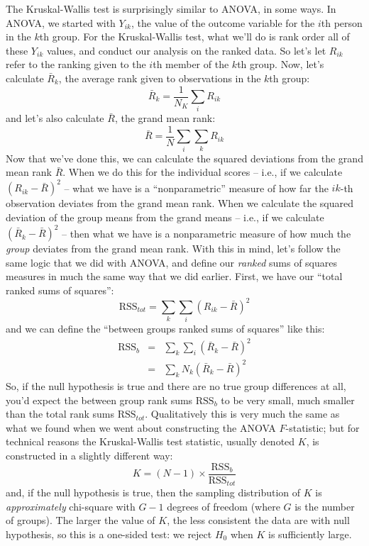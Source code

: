 The Kruskal-Wallis test is surprisingly similar to ANOVA, in some ways. In ANOVA, we started with $Y_{ik}$, the value of the outcome variable for the $i$th person in the $k$th group. For the Kruskal-Wallis test, what we'll do is rank order all of these $Y_{ik}$ values, and conduct our analysis on the ranked data. So let's let $R_{ik}$ refer to the ranking given to the $i$th member of the $k$th group. Now, let's calculate $\bar{R}_k$, the average rank given to observations in the $k$th group:
$$
\bar{R}_k = \frac{1}{N_K} \sum_{i} R_{ik}
$$
and let's also calculate $\bar{R}$, the grand mean rank:
$$
\bar{R} = \frac{1}{N} \sum_{i} \sum_{k} R_{ik}
$$
Now that we've done this, we can calculate the squared deviations from the grand mean rank $\bar{R}$. When we do this for the individual scores -- i.e., if we calculate $(R_{ik} - \bar{R})^2$ -- what we have is a ``nonparametric'' measure of how far the $ik$-th observation deviates from the grand mean rank. When we calculate the squared deviation of the group means from the grand means -- i.e., if we calculate $(\bar{R}_k  - \bar{R} )^2$ -- then what we have is a nonparametric measure of how much the {\it group} deviates from the grand mean rank. With this in mind, let's follow the same logic that we did with ANOVA, and define our {\it ranked} sums of squares measures in much the same way that we did earlier. First, we have our ``total ranked sums of squares'':
$$
\mbox{RSS}_{tot} = \sum_k \sum_i ( R_{ik} - \bar{R} )^2
$$
and we can define the ``between groups ranked sums of squares'' like this:
$$
\begin{array}{rcl}
\mbox{RSS}_{b} &=& \sum_k \sum_i ( \bar{R}_k  - \bar{R} )^2 \\
&=& \sum_k N_k ( \bar{R}_k  - \bar{R} )^2 
\end{array}
$$
So, if the null hypothesis is true and there are no true group differences at all, you'd expect the between group rank sums $\mbox{RSS}_{b}$ to be very small, much smaller than the total rank sums $\mbox{RSS}_{tot}$. Qualitatively this is very much the same as what we found when we went about constructing the ANOVA $F$-statistic; but for technical reasons the Kruskal-Wallis test statistic, usually denoted $K$, is constructed in a slightly different way: 
$$
K = (N - 1) \times \frac{\mbox{RSS}_b}{\mbox{RSS}_{tot}}
$$
and, if the null hypothesis is true, then the sampling distribution of $K$ is {\it approximately} chi-square with $G-1$ degrees of freedom (where $G$ is the number of groups). The larger the value of $K$, the less consistent the data are with null hypothesis, so this is a one-sided test: we reject $H_0$ when $K$ is sufficiently large.



